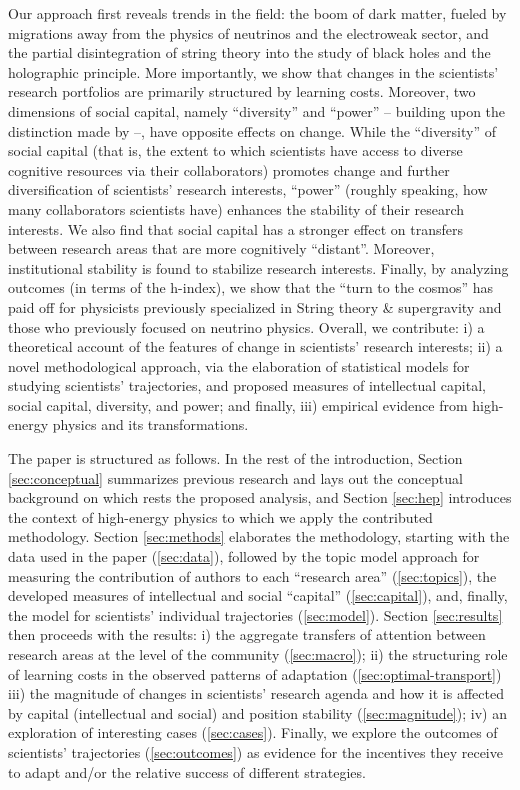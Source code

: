 \documentclass{article}
\begin{document}
Our approach first reveals trends in the field: the boom of dark matter, fueled by migrations away from the physics of neutrinos and the electroweak sector, and the partial disintegration of string theory into the study of black holes and the holographic principle. More importantly, we show that changes in the scientists' research portfolios are primarily structured by learning costs. Moreover, two dimensions of social capital, namely ``diversity'' and ``power''  -- building upon the distinction made by \citet{Abbasi2014} --, have opposite effects on change. While the ``diversity'' of social capital (that is, the extent to which scientists have access to diverse cognitive resources via their collaborators) promotes change and further diversification of scientists' research interests, ``power'' (roughly speaking, how many collaborators scientists have) enhances the stability of their research interests. We also find that social capital has a stronger effect on transfers between research areas that are more cognitively ``distant''. Moreover, institutional stability is found to stabilize research interests. Finally, by analyzing outcomes (in terms of the h-index), we show that the ``turn to the cosmos'' has paid off for physicists previously specialized in String theory \& supergravity and those who previously focused on neutrino physics. Overall, we contribute: i) a theoretical account of the features of change in scientists' research interests; ii) a novel methodological approach, via the elaboration of statistical models for studying scientists' trajectories, and proposed measures of intellectual capital, social capital, diversity, and power; and finally, iii) empirical evidence from high-energy physics and its transformations.

The paper is structured as follows. In the rest of the introduction, Section \ref{sec:conceptual} summarizes previous research and lays out the conceptual background on which rests the proposed analysis, and Section \ref{sec:hep} introduces the context of high-energy physics to which we apply the contributed methodology. %
Section \ref{sec:methods} elaborates the methodology, starting with the data used in the paper (\ref{sec:data}), followed by the topic model approach for measuring the contribution of authors to each ``research area'' (\ref{sec:topics}), the developed measures of intellectual and social ``capital'' (\ref{sec:capital}), and, finally, the model for scientists' individual trajectories (\ref{sec:model}).
Section \ref{sec:results} then proceeds with the results: i) the aggregate transfers of attention between research areas at the level of the community (\ref{sec:macro}); ii) the structuring role of learning costs in the observed patterns of adaptation (\ref{sec:optimal-transport}) iii) the magnitude of changes in scientists' research agenda and how it is affected by capital (intellectual and social) and position stability (\ref{sec:magnitude});  iv) an exploration of interesting cases (\ref{sec:cases}). Finally, we explore the outcomes of scientists' trajectories (\ref{sec:outcomes}) as evidence for the incentives they receive to adapt and/or the relative success of different strategies. 
\end{document}
